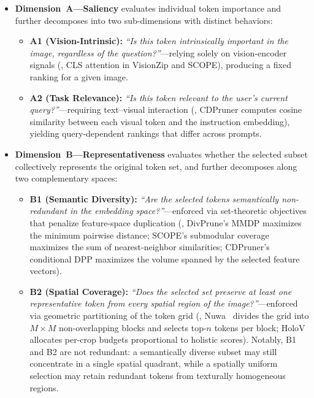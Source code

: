 \begin{itemize}[leftmargin=*]
  \item \textbf{Dimension~A---Saliency} evaluates individual token importance and further decomposes into two sub-dimensions with distinct behaviors:
  \begin{itemize}
    \item \textbf{A1 (Vision-Intrinsic):} \textit{``Is this token intrinsically important in the image, regardless of the question?''}---relying solely on vision-encoder signals (\eg, CLS attention in VisionZip and SCOPE), producing a fixed ranking for a given image.
    \item \textbf{A2 (Task Relevance):} \textit{``Is this token relevant to the user's current query?''}---requiring text--visual interaction (\eg, CDPruner computes cosine similarity between each visual token and the instruction embedding), yielding query-dependent rankings that differ across prompts.
  \end{itemize}
  \item \textbf{Dimension~B---Representativeness} evaluates whether the selected subset collectively represents the original token set, and further decomposes along two complementary spaces:
  \begin{itemize}
    \item \textbf{B1 (Semantic Diversity):}
          \textit{``Are the selected tokens semantically non-redundant in the embedding space?''}---enforced via set-theoretic objectives that penalize feature-space duplication (\eg, DivPrune's MMDP maximizes the minimum pairwise distance; SCOPE's submodular coverage maximizes the sum of nearest-neighbor similarities; CDPruner's conditional DPP maximizes the volume spanned by the selected feature vectors).
    \item \textbf{B2 (Spatial Coverage):}
          \textit{``Does the selected set preserve at least one representative token from every spatial region of the image?''}---enforced via geometric partitioning of the token grid (\eg, Nuwa~\cite{nuwa} divides the grid into $M{\times}M$ non-overlapping blocks and selects top-$n$ tokens per block; HoloV~\cite{holov} allocates per-crop budgets proportional to holistic scores).
          Notably, B1 and B2 are not redundant: a semantically diverse subset may still concentrate in a single spatial quadrant, while a spatially uniform selection may retain redundant tokens from texturally homogeneous regions.
  \end{itemize}
\end{itemize}

